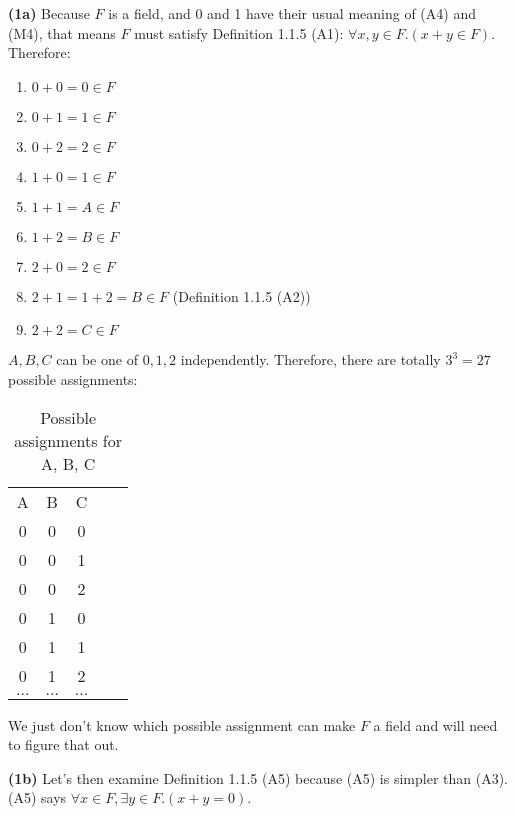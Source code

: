 \documentclass[12pt, letterpaper, oneside]{book}
\begin{document}
\textbf{(1a)} Because $F$ is a field, and 0 and 1 have their usual meaning of (A4) and (M4), that means $F$ must satisfy Definition
1.1.5 (A1): $\forall x, y \in F. (x + y \in F)$. Therefore:
\begin{enumerate}
  \item $0 + 0 = 0 \in F$
  \item $0 + 1 = 1 \in F$
  \item $0 + 2 = 2 \in F$
  \item $1 + 0 = 1 \in F$
  \item $1 + 1 = A \in F$
  \item $1 + 2 = B \in F$
  \item $2 + 0 = 2 \in F$
  \item $2 + 1 = 1 + 2 = B \in F$ (Definition 1.1.5 (A2))
  \item $2 + 2 = C \in F$
\end{enumerate}

$A, B, C$ can be one of $0, 1, 2$ independently. Therefore, there are totally $3^3 = 27$ possible assignments:

\begin{table}[H]
  \centering
  \begin{tabular}{|c|c|c|ll}
    \cline{1-3}
    A        & B        & C        &  & \\ [1ex] \cline{1-3}
    0        & 0        & 0        &  & \\ [0.5ex] \cline{1-3}
    0        & 0        & 1        &  & \\ [0.5ex] \cline{1-3}
    0        & 0        & 2        &  & \\ [0.5ex] \cline{1-3}
    0        & 1        & 0        &  & \\ [0.5ex] \cline{1-3}
    0        & 1        & 1        &  & \\ [0.5ex] \cline{1-3}
    0        & 1        & 2        &  & \\ [0.5ex] \cline{1-3}
    $\ldots$ & $\ldots$ & $\ldots$ &  & \\ [0.5ex] \cline{1-3}
  \end{tabular}
  \caption{Possible assignments for A, B, C}
  \label{table:1.1.8-1a}
\end{table}

We just don't know which possible assignment can make $F$ a field and will need to figure that out.

\textbf{(1b)} Let's then examine Definition 1.1.5 (A5) because (A5) is simpler than (A3). (A5) says $\forall x \in F,
  \exists y \in F. (x + y = 0)$.
\end{document}

